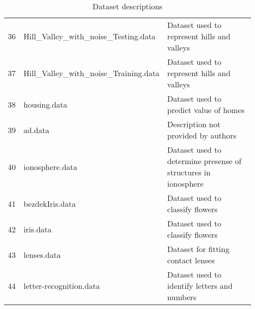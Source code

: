 \begin{table}
{\begin{tabular}{lll}
36 &      Hill\_Valley\_with\_noise\_Testing.data & Dataset used to represent hills and valleys\\
37 &     Hill\_Valley\_with\_noise\_Training.data &  Dataset used to represent hills and valleys\\
38 &                             housing.data & Dataset used to predict value of homes\\
39 &                                  ad.data & Description not provided by authors\\
40 &                          ionosphere.data & Dataset used to determine presense of structures in ionosphere\\
41 &                          bezdekIris.data & Dataset used to classify flowers\\
42 &                                iris.data & Dataset used to classify flowers\\
43 &                              lenses.data & Dataset for fitting contact lenses\\
44 &                  letter-recognition.data & Dataset used to identify letters and numbers\\
\bottomrule
\end{tabular}}
\caption{Dataset descriptions}
\end{table}
